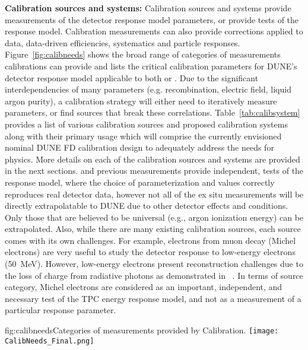 \textbf{Calibration sources and systems:} Calibration sources and systems provide measurements of the detector response model parameters, or provide tests of the response model. Calibration measurements can also provide corrections applied to data, data-driven efficiencies, systematics and particle responses. Figure~\ref{fig:calibneeds} shows the broad range of categories of measurements calibrations can provide and lists the critical calibration parameters for DUNE's detector response model applicable to both  or . Due to the significant interdependencies of many parameters (e.g. recombination, electric field, liquid argon purity), a calibration strategy will either need to iteratively measure parameters, or find sources that break these correlations. Table~\ref{tab:calibsystem} provides a list of various calibration sources and proposed calibration systems along with their primary usage which will comprise the currently envisioned nominal DUNE FD calibration design to adequately address the needs for physics. More details on each of the calibration sources and systems are provided in the next sections.  and previous measurements provide independent, tests of the response model, where the choice of parameterization and values correctly reproduces real detector data, however not all of the ex situ measurements will be directly extrapolatable to DUNE due to other detector effects and conditions. Only those that are believed to be universal (e.g., argon ionization energy) can be extrapolated. Also, while there are many existing calibration sources, each source comes with its own challenges. For example, electrons from muon decay (Michel electrons) are very useful to study the detector response to low-energy electrons (\SI{50}{\MeV}). However, low-energy electrons present reconstruction challenges due to the loss of charge from radiative photons as demonstrated in ~\cite{Acciarri:2017sjy}. In terms of source category, Michel electrons are considered as an important, independent, and necessary test of the TPC energy response model, and not as a measurement of a particular response parameter.

\begin{dunefigure}{fig:calibneeds}{Categories of measurements provided by Calibration.}
\texttt{[image: CalibNeeds\_Final.png]}
\end{dunefigure}

